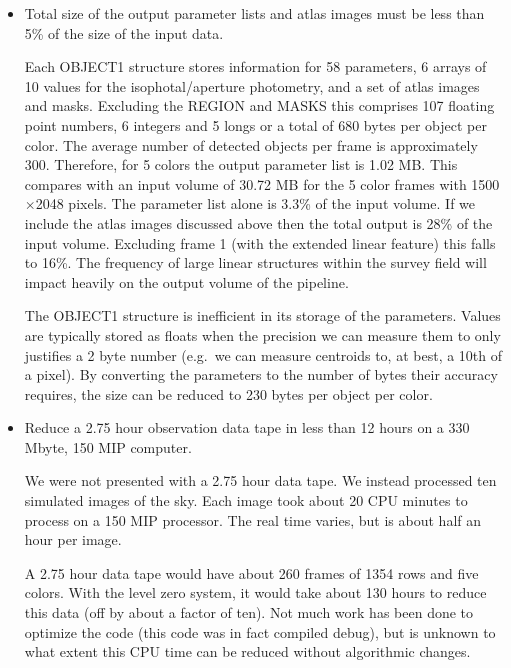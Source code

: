 \begin{itemize}
\item Total size of the output parameter lists and atlas images must
be less than 5\% of the size of the input data.

Each OBJECT1 structure stores information for 58 parameters, 6 arrays
of 10 values for the isophotal/aperture photometry, and a set of
atlas images and masks. Excluding the REGION and MASKS this comprises
107 floating point numbers, 6 integers and 5 longs or a total of 680
bytes per object per color. The average number of detected objects per
frame is approximately 300. Therefore, for 5 colors the output
parameter list is 1.02 MB. This compares with an input volume of 30.72
MB for the 5 color frames with 1500$\times$2048 pixels. The parameter list
alone is 3.3\% of the input volume. If we include the atlas
images discussed above then the total output is 28\% of
the input volume. Excluding frame 1 (with the extended linear feature) this
falls to 16\%. The frequency of large linear structures within the survey
field will impact heavily on the output volume of the pipeline.

The OBJECT1 structure is inefficient in its storage of the parameters.
Values are typically stored as floats when the precision we can
measure them to only justifies a 2 byte number (e.g.\ we can measure
centroids to, at best, a 10th of a pixel). By converting the
parameters to the number of bytes their accuracy requires, the size can
be reduced to 230 bytes per object per color.

\item Reduce a 2.75 hour observation data tape in less than 12 hours
on a 330 Mbyte, 150 MIP computer.

We were not presented with a 2.75 hour data tape.  We instead processed
ten simulated images of the sky.  Each image took about 20 CPU minutes
to process on a 150 MIP processor.  The real time varies, but is about
half an hour per image.

A 2.75 hour data tape would have about 260 frames of 1354 rows and five
colors.  With the level zero system, it would take about 130 hours to
reduce this data (off by about a factor of ten).  Not much work has been
done to optimize the code (this code was in fact compiled debug), but
is unknown to what extent this CPU time can be reduced without
algorithmic changes.


\end{itemize}
